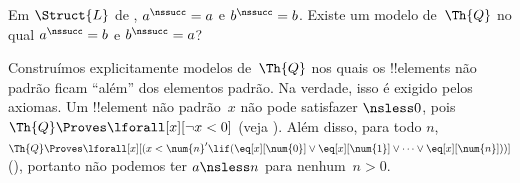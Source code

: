 \documentclass[../../../include/open-logic-section]{subfiles}
\begin{document}
\begin{prob}
Em $\Struct{L}$ de , $a^\nssucc
= a$ e $b^\nssucc = b$. Existe um modelo de~$\Th{Q}$ no qual
$a^\nssucc = b$ e $b^\nssucc = a$?
\end{prob}

\begin{explain}
Construímos explicitamente modelos de~$\Th{Q}$ nos quais os
!!{element}s não padrão ficam ``além'' dos elementos padrão. Na
verdade, isso é exigido pelos axiomas. Um !!{element} não padrão~$x$
não pode satisfazer ${} \nsless 0$, pois $\Th{Q} \Proves
\lforall[x][\lnot x<0]$ (veja ).
Além disso, para todo $n$, $\Th{Q} \Proves \lforall[x][(x <
\num{n}' \lif (\eq[x][\num{0}] \lor \eq[x][\num{1}] \lor \dots \lor
\eq[x][\num{n}]))]$ (), portanto
não podemos ter $a \nsless n$ para nenhum~$n>0$.
\end{explain}
\end{document}
